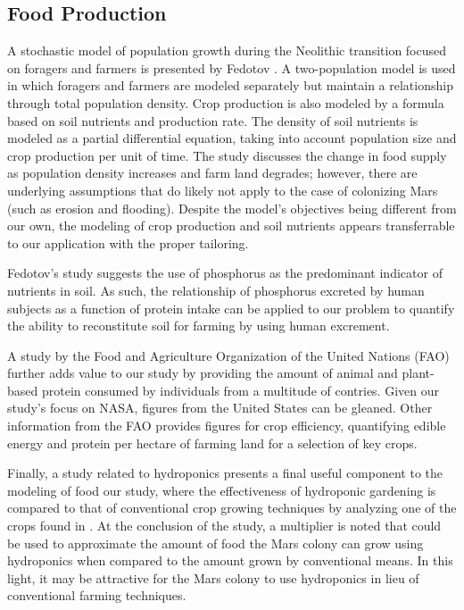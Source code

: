 \documentclass[12pt]{article}
\begin{document}
\subsection{Food Production}

A stochastic model of population growth	during the Neolithic transition focused
on foragers and farmers is presented by Fedotov \cite{fedotov2008stochastic}. A
two-population model is used in which foragers and farmers are modeled
separately but maintain a relationship through total population density.
Crop production is also modeled by a formula based on soil nutrients and
production rate. The density of soil nutrients is modeled as a partial
differential equation, taking into account population size and crop production
per unit of time. The study discusses the change in food supply as population
density increases and farm land degrades; however, there are underlying
assumptions that do likely not apply to the case of colonizing Mars (such as
erosion and flooding). Despite the model's objectives being different from our
own, the modeling of crop production and soil nutrients appears transferrable
to our application with the proper tailoring.

Fedotov's study \cite{fedotov2008stochastic} suggests the use of phosphorus as
the predominant indicator of nutrients in soil. As such, the relationship of
phosphorus excreted by human subjects as a function of protein intake
\cite{pooOnYOu} can be applied to our problem to quantify the ability to
reconstitute soil for farming by using human excrement.

A study by the Food and Agriculture Organization of the United Nations (FAO)
\cite{faoProtein} further adds value to our study by providing the
amount of animal and plant-based protein consumed by individuals from a
multitude of contries. Given our study's focus on NASA, figures from the United
States can be gleaned. Other information from the FAO \cite{faoNutrition}
provides figures for crop efficiency, quantifying edible energy
and protein per hectare of farming land for a selection of key crops.

Finally, a study related to hydroponics \cite{iHeartHydroponics} presents a
final useful component to the modeling of food our study, where the
effectiveness of hydroponic gardening is compared to that of conventional crop
growing techniques by analyzing one of the crops found in \cite{faoNutrition}.
At the conclusion of the study, a multiplier is noted that could be used to
approximate the amount of food the Mars colony can grow using hydroponics when
compared to the amount grown by conventional means. In this light, it may be
attractive for the Mars colony to use hydroponics in lieu of conventional
farming techniques.
\end{document}
